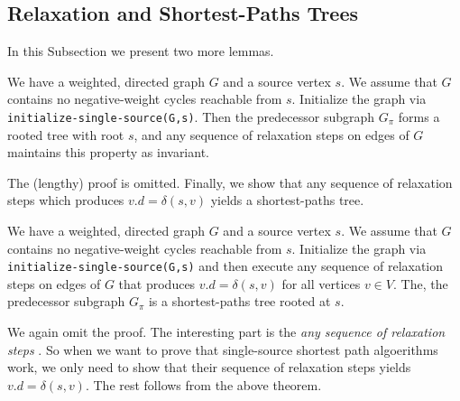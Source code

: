 \subsection{Relaxation and Shortest-Paths Trees}

In this Subsection we present two more lemmas.

\begin{theorem} We have a weighted, directed graph $G$ and a source vertex $s$. We assume that $G$ contains no negative-weight cycles reachable from $s$. Initialize the graph via \verb|initialize-single-source(G,s)|. Then the predecessor subgraph $G_\pi$ forms a rooted tree with root $s$, and any sequence of relaxation steps on edges of $G$ maintains this property as invariant.
\end{theorem}

The (lengthy) proof is omitted. Finally, we show that any sequence of relaxation steps which produces $v.d = \delta(s,v)$ yields a shortest-paths tree.

\begin{theorem} We have a weighted, directed graph $G$ and a source vertex $s$. We assume that $G$ contains no negative-weight cycles reachable from $s$. Initialize the graph via \verb|initialize-single-source(G,s)|  and then execute any sequence of relaxation steps on edges of $G$ that produces $v.d = \delta(s,v)$ for all vertices $v \in V$. The, the predecessor subgraph $G_\pi$ is a shortest-paths tree rooted at $s$. 
\end{theorem}

We again omit the proof. The interesting part is the \emph{any sequence of relaxation steps} . So when we want to prove that single-source shortest path algoerithms work, we only need to show that their sequence of relaxation steps yields $v.d = \delta(s,v)$. The rest follows from the above theorem.





